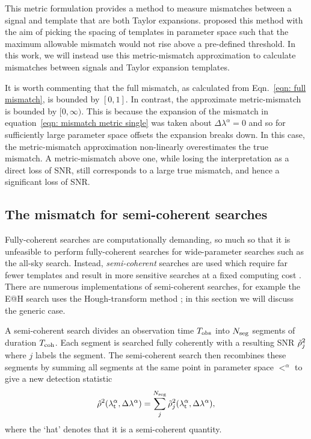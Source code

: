\documentclass[../full_thesis/full_thesis.tex]{subfiles}
\begin{document}
This metric formulation provides a method to measure mismatches between a
signal and template that are both Taylor expansions. \citet{Brady1998} proposed
this method with the aim of picking the spacing of templates in parameter space
such that the maximum allowable mismatch would not rise above a pre-defined
threshold. In this work, we will instead use this metric-mismatch approximation to
calculate mismatches between signals and Taylor expansion templates.

It is worth commenting that the full mismatch, as calculated from
Eqn.~\eqref{eqn: full mismatch}, is bounded by $[0, 1]$. In contrast, the
approximate metric-mismatch is bounded by $[0, \infty)$. This is because the
expansion of the mismatch in equation~\eqref{eqn: mismatch metric single} was
taken about $\Delta\lambda^{\alpha}=0$ and so for sufficiently large parameter
space offsets the expansion breaks down. In this case, the metric-mismatch
approximation non-linearly overestimates the true mismatch. A metric-mismatch
above one, while losing the interpretation as a direct loss of SNR, still
corresponds to a large true mismatch, and hence a significant loss of SNR.


\subsection{The mismatch for semi-coherent searches}
\label{sec: semi-coherent mismatch}

Fully-coherent searches are computationally demanding, so much so that it is
unfeasible to perform fully-coherent searches for wide-parameter searches
such as the all-sky search. Instead, \emph{semi-coherent}
searches are used which require far fewer templates and result in more
sensitive searches at a fixed computing cost \citep{Prix2009}. There are numerous
implementations of semi-coherent searches, for example the E@H search uses
the Hough-transform method \citep{Krishnan2004}; in this section we will discuss
the generic case.

A semi-coherent search divides an observation time $T_{\mathrm{obs}}$ into $N_{\textrm{seg}}$ segments of
duration $T_{\mathrm{coh}}$. Each segment is searched fully coherently with a resulting
SNR $\tilde{\rho}^{2}_{j}$ where $j$ labels the
segment. The semi-coherent search then recombines these segments by summing
all segments at the same point in parameter space $\lt^{\alpha}$ to give a new
detection statistic
\begin{align}
\hat{\rho}^{2}({\lambda}_\textrm{t}^{\alpha}, \Delta\lambda^{\alpha}) =
 \sum_{j}^{N_{\textrm{seg}}}\tilde{\rho}^{2}_{j}({\lambda}_\textrm{t}^{\alpha}, \Delta\lambda^{\alpha}),
\label{eqn: semi-coherent sum}
\end{align}
where the `hat' denotes that it is a semi-coherent quantity.
\end{document}
